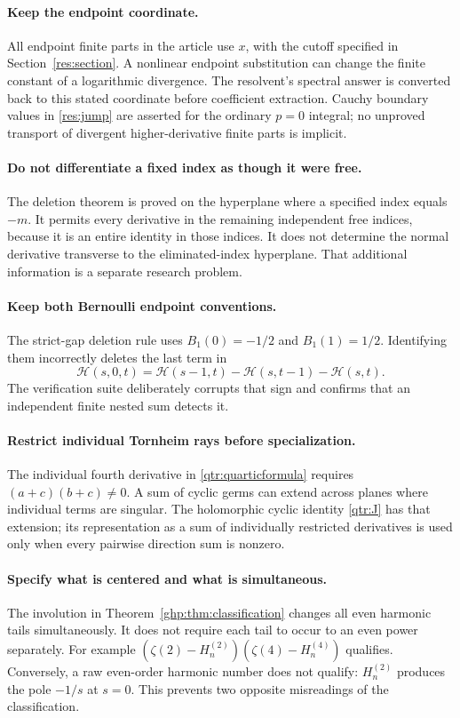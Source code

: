 \paragraph{Keep the endpoint coordinate.}
All endpoint finite parts in the article use $x$, with the
cutoff specified in Section~\ref{res:section}. A nonlinear
endpoint substitution can change the finite constant of a
logarithmic divergence. The resolvent's spectral answer is
converted back to this stated coordinate before coefficient
extraction. Cauchy boundary values in \eqref{res:jump} are
asserted for the ordinary $p=0$ integral; no unproved transport
of divergent higher-derivative finite parts is implicit.

\paragraph{Do not differentiate a fixed index as though it were free.}
The deletion theorem is proved on the hyperplane where a
specified index equals $-m$. It permits every derivative in
the remaining independent free indices, because it is an
entire identity in those indices. It does not determine the
normal derivative transverse to the eliminated-index
hyperplane. That additional information is a separate research
problem.

\paragraph{Keep both Bernoulli endpoint conventions.}
The strict-gap deletion rule uses $B_1(0)=-1/2$ and
$B_1(1)=1/2$. Identifying them incorrectly deletes the last
term in
\[
 \mathcal H(s,0,t)=\mathcal H(s-1,t)
                 -\mathcal H(s,t-1)-\mathcal H(s,t).
\]
The verification suite deliberately corrupts that sign and
confirms that an independent finite nested sum detects it.

\paragraph{Restrict individual Tornheim rays before specialization.}
The individual fourth derivative in \eqref{qtr:quarticformula}
requires $(a+c)(b+c)\ne0$. A sum of cyclic germs can extend
across planes where individual terms are singular. The
holomorphic cyclic identity \eqref{qtr:J} has that extension;
its representation as a sum of individually restricted
derivatives is used only when every pairwise direction sum
is nonzero.

\paragraph{Specify what is centered and what is simultaneous.}
The involution in Theorem~\ref{ghp:thm:classification} changes
all even harmonic tails simultaneously. It does not require
each tail to occur to an even power separately. For example
$(\zeta(2)-H_n^{(2)})(\zeta(4)-H_n^{(4)})$ qualifies.
Conversely, a raw even-order harmonic number does not qualify:
$H_n^{(2)}$ produces the pole $-1/s$ at $s=0$.
This prevents two opposite misreadings of the classification.

